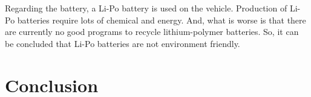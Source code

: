 \documentclass[a4paper,12pt]{article}
\begin{document}
		Regarding the battery, a Li-Po battery is used on the vehicle. Production of Li-Po batteries require lots of chemical and energy. And, what is worse is that there are currently no good programs to recycle lithium-polymer batteries. So, it can be concluded that Li-Po batteries are not environment friendly.


	\section{Conclusion}


		

\newpage



\begin{appendices}






%

%



\end{appendices}
\end{document}
